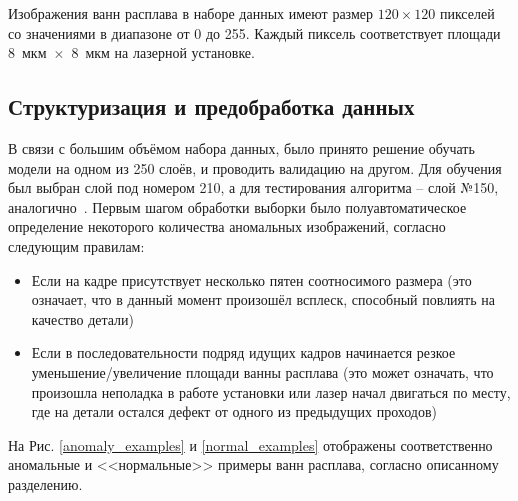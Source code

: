\documentclass{article}
\begin{document}
    Изображения ванн расплава в наборе данных имеют размер $120 \times 120$ пикселей со значениями в диапазоне от 0 до 255. Каждый пиксель соответствует площади $8$~мкм~$\times$~$8$~мкм на лазерной установке. 

\subsection{Структуризация и предобработка данных}\label{struct}
    В связи с большим объёмом набора данных, было принято решение обучать модели на одном из 250 слоёв, и проводить валидацию на другом. Для обучения был выбран слой под номером 210, а для тестирования алгоритма -- слой №150, аналогично~\cite{convlstm_nist}. Первым шагом обработки выборки было полуавтоматическое определение некоторого количества аномальных изображений, согласно следующим правилам: \begin{itemize}
        \item Если на кадре присутствует несколько пятен соотносимого размера (это означает, что в данный момент произошёл всплеск, способный повлиять на качество детали)
        \item Если в последовательности подряд идущих кадров начинается резкое уменьшение/увеличение площади ванны расплава (это может означать, что произошла неполадка в работе установки или лазер начал двигаться по месту, где на детали остался дефект от одного из предыдущих проходов)
    \end{itemize} На Рис. \ref{anomaly_examples} и \ref{normal_examples} отображены соответственно аномальные и <<нормальные>> примеры ванн расплава, согласно описанному разделению.
\end{document}
